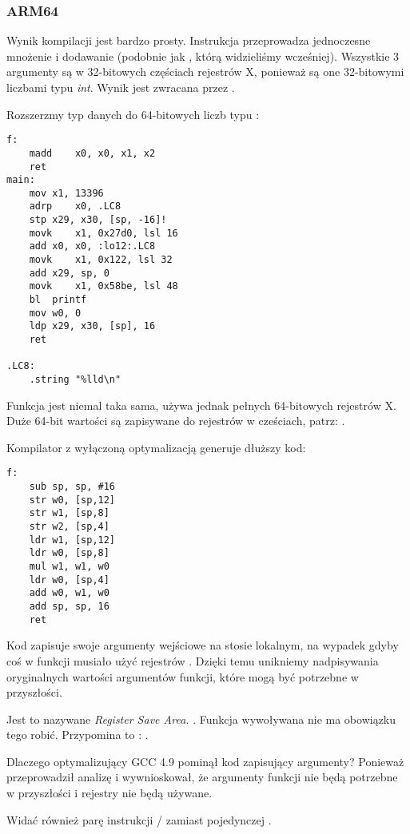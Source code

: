 \subsubsection{ARM64}


Wynik kompilacji jest bardzo prosty.
Instrukcja  przeprowadza jednoczesne mnożenie i dodawanie (podobnie jak , którą widzieliśmy wcześniej).
Wszystkie 3 argumenty są w 32-bitowych częściach rejestrów X, ponieważ są one 32-bitowymi liczbami typu \emph{int}.
Wynik jest zwracana przez .



Rozszerzmy typ danych do 64-bitowych liczb typu :



\begin{lstlisting}[style=customasmARM]
f:
	madd	x0, x0, x1, x2
	ret
main:
	mov	x1, 13396
	adrp	x0, .LC8
	stp	x29, x30, [sp, -16]!
	movk	x1, 0x27d0, lsl 16
	add	x0, x0, :lo12:.LC8
	movk	x1, 0x122, lsl 32
	add	x29, sp, 0
	movk	x1, 0x58be, lsl 48
	bl	printf
	mov	w0, 0
	ldp	x29, x30, [sp], 16
	ret

.LC8:
	.string	"%lld\n"
\end{lstlisting}

Funkcja \ttf{} jest niemal taka sama, używa jednak pełnych 64-bitowych rejestrów X.
Duże 64-bit wartości są zapisywane do rejestrów w cześciach, patrz: .


Kompilator z wyłączoną optymalizacją generuje dłuższy kod:

\begin{lstlisting}[style=customasmARM]
f:
	sub	sp, sp, #16
	str	w0, [sp,12]
	str	w1, [sp,8]
	str	w2, [sp,4]
	ldr	w1, [sp,12]
	ldr	w0, [sp,8]
	mul	w1, w1, w0
	ldr	w0, [sp,4]
	add	w0, w1, w0
	add	sp, sp, 16
	ret
\end{lstlisting}

Kod zapisuje swoje argumenty wejściowe na stosie lokalnym,
na wypadek gdyby coś w funkcji musiało użyć rejestrów .
Dzięki temu unikniemy nadpisywania oryginalnych wartości
argumentów funkcji, które mogą być potrzebne w przyszłości.

Jest to nazywane \emph{Register Save Area.} \ARMPCS.
Funkcja wywoływana nie ma obowiązku tego robić.
Przypomina to : .

Dlaczego optymalizujący GCC 4.9 pominął kod zapisujący argumenty?
Ponieważ przeprowadził analizę i wywnioskował,
że argumenty funkcji nie będą potrzebne w przyszłości i rejestry
 nie będą używane.


Widać również parę instrukcji / zamiast pojedynczej .
